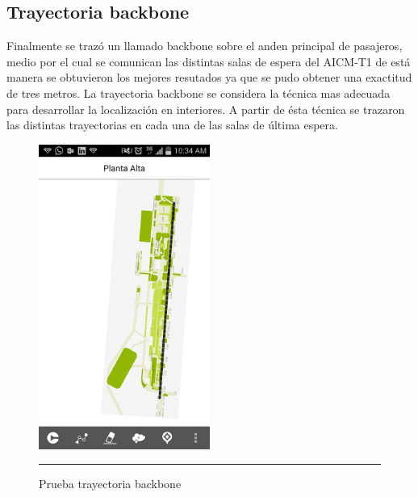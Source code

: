 \subsection{Trayectoria backbone}
Finalmente se trazó un llamado backbone sobre el anden principal de pasajeros, medio por el cual se comunican las distintas salas de espera 
del AICM-T1 de está manera se obtuvieron los mejores resutados ya que se pudo obtener una exactitud de tres metros. La trayectoria backbone se considera la técnica mas adecuada para desarrollar la localización en interiores. A partir de ésta técnica se trazaron las distintas trayectorias en cada una de las salas de última espera.
\begin{figure}[h]
	\centering
		\includegraphics[width=0.5\textwidth]{Figuras/backbone.png}
		\rule{30em}{0.5pt}
	\caption[Prueba trayectoria backbone]{Prueba trayectoria backbone}
	\label{fig:vistaPruebaBackbone}
\end{figure}
\clearpage

